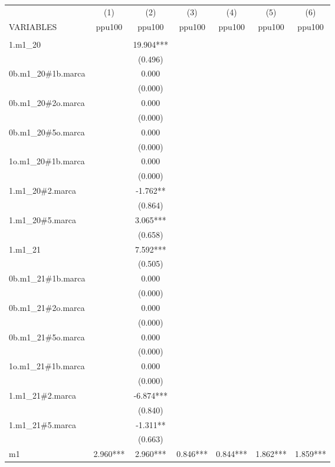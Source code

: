 \begin{tabular}{lcccccc} \hline
 & (1) & (2) & (3) & (4) & (5) & (6) \\
VARIABLES & ppu100 & ppu100 & ppu100 & ppu100 & ppu100 & ppu100 \\ \hline
 &  &  &  &  &  &  \\
1.m1\_20 &  & 19.904*** &  &  &  &  \\
 &  & (0.496) &  &  &  &  \\
0b.m1\_20\#1b.marca &  & 0.000 &  &  &  &  \\
 &  & (0.000) &  &  &  &  \\
0b.m1\_20\#2o.marca &  & 0.000 &  &  &  &  \\
 &  & (0.000) &  &  &  &  \\
0b.m1\_20\#5o.marca &  & 0.000 &  &  &  &  \\
 &  & (0.000) &  &  &  &  \\
1o.m1\_20\#1b.marca &  & 0.000 &  &  &  &  \\
 &  & (0.000) &  &  &  &  \\
1.m1\_20\#2.marca &  & -1.762** &  &  &  &  \\
 &  & (0.864) &  &  &  &  \\
1.m1\_20\#5.marca &  & 3.065*** &  &  &  &  \\
 &  & (0.658) &  &  &  &  \\
1.m1\_21 &  & 7.592*** &  &  &  &  \\
 &  & (0.505) &  &  &  &  \\
0b.m1\_21\#1b.marca &  & 0.000 &  &  &  &  \\
 &  & (0.000) &  &  &  &  \\
0b.m1\_21\#2o.marca &  & 0.000 &  &  &  &  \\
 &  & (0.000) &  &  &  &  \\
0b.m1\_21\#5o.marca &  & 0.000 &  &  &  &  \\
 &  & (0.000) &  &  &  &  \\
1o.m1\_21\#1b.marca &  & 0.000 &  &  &  &  \\
 &  & (0.000) &  &  &  &  \\
1.m1\_21\#2.marca &  & -6.874*** &  &  &  &  \\
 &  & (0.840) &  &  &  &  \\
1.m1\_21\#5.marca &  & -1.311** &  &  &  &  \\
 &  & (0.663) &  &  &  &  \\
m1 & 2.960*** & 2.960*** & 0.846*** & 0.844*** & 1.862*** & 1.859*** \\

\end{tabular}
